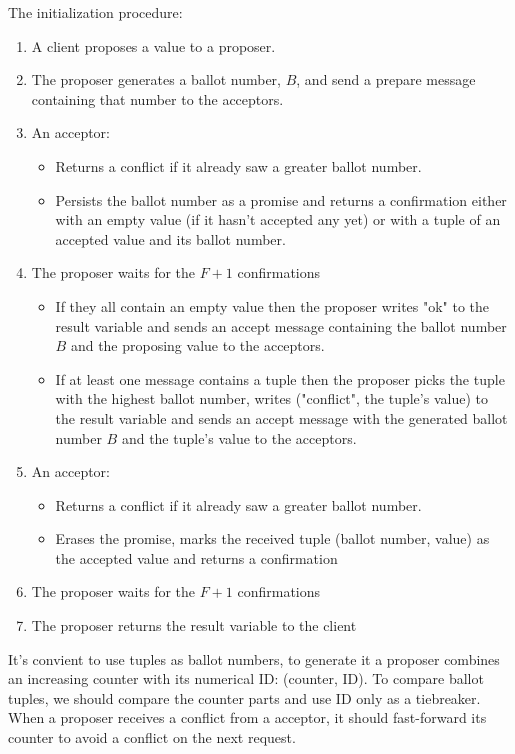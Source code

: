 \documentclass[12pt]{article}
\theoremstyle{definition}
\begin{document}
The initialization procedure:
\begin{enumerate}
  \item A client proposes a value to a proposer.
  \item The proposer generates a ballot number, $B$, and send a prepare message containing that number to the acceptors.
  \item An acceptor:
  \begin{itemize}
    \item Returns a conflict if it already saw a greater ballot number.
    \item Persists the ballot number as a promise and returns a confirmation either with an empty value (if it hasn't accepted any yet) or with a tuple of an accepted value and its ballot number.
  \end{itemize}
  \item The proposer waits for the $F+1$ confirmations
  \begin{itemize}
    \item If they all contain an empty value then the proposer writes "ok" to the result variable and sends an accept message containing the ballot number $B$ and the proposing value to the acceptors.
    \item If at least one message contains a tuple then the proposer picks the tuple with the highest ballot number, writes ("conflict", the tuple's value) to the result variable and sends an accept message with the generated ballot number $B$ and the tuple's value to the acceptors.
  \end{itemize}
  \item An acceptor:
  \begin{itemize}
    \item Returns a conflict if it already saw a greater ballot number.
    \item Erases the promise, marks the received tuple (ballot number, value) as the accepted value and returns a confirmation
  \end{itemize}
  \item The proposer waits for the $F+1$ confirmations
  \item The proposer returns the result variable to the client
\end{enumerate}

It's convient to use tuples as ballot numbers, to generate it a proposer combines an increasing counter with its numerical ID: (counter, ID). To compare ballot tuples, we should compare the counter parts and use ID only as a tiebreaker. When a proposer receives a conflict from a acceptor, it should fast-forward its counter to avoid a conflict on the next request.
\end{document}
